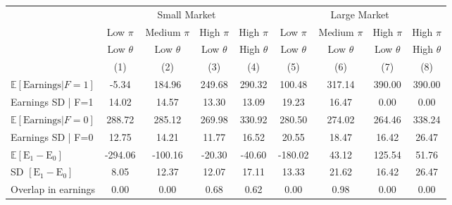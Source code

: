 \begin{tabular}{l cc cc cc cc}
\hline
 & \multicolumn{4}{c}{Small Market} & \multicolumn{4}{c}{Large Market} \\ \cmidrule(lr){2-5}\cmidrule(lr){6-9} 
 &  Low $\pi$  & Medium $\pi$ & High $\pi$ & High $\pi$ &  Low $\pi$  & Medium $\pi$ & High $\pi$ & High $\pi$  \\ 
 &  Low $\theta$   & Low $\theta$     &  Low $\theta$ & High $\theta$       &  Low $\theta$   & Low $\theta$     &  Low $\theta$ & High $\theta$ \\
 &  (1)     & (2)       & (3)                             & (4) & (5) & (6) & (7) & (8) \\ 
\hline
$ \mathbb{E}[\text{Earnings} | F=1]$ &  -5.34    & 184.96   & 249.68   & 290.32   & 100.48   & 317.14   & 390.00   & 390.00    \\ 
Earnings SD | F=1 &  14.02    & 14.57    & 13.30    & 13.09    & 19.23    & 16.47    & 0.00     & 0.00      \\ 
$ \mathbb{E}[\text{Earnings} | F=0]$ &  288.72   & 285.12   & 269.98   & 330.92   & 280.50   & 274.02   & 264.46   & 338.24    \\ 
Earnings SD | F=0 &  12.75    & 14.21    & 11.77    & 16.52    & 20.55    & 18.47    & 16.42    & 26.47     \\ 
$ \mathbb{E}[\text{E}_{1} - \text{E}_{0} ]$  &  -294.06  & -100.16  & -20.30   & -40.60   & -180.02  & 43.12    & 125.54   & 51.76     \\ 
SD $[\text{E}_{1} - \text{E}_{0} ]$ &  8.05     & 12.37    & 12.07    & 17.11    & 13.33    & 21.62    & 16.42    & 26.47     \\ 
Overlap in earnings &  0.00     & 0.00     & 0.68     & 0.62     & 0.00     & 0.98     & 0.00     & 0.00      \\ 
\hline
\end{tabular}
